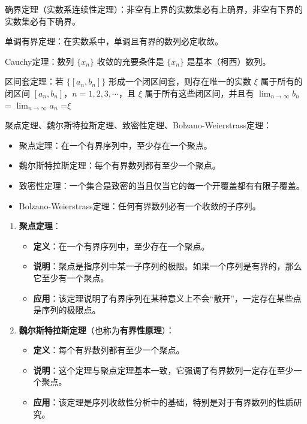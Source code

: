 \documentclass[lang=cn,newtx,10pt,scheme=chinese]{elegantbook}
\begin{document}
\begin{change}
  \item 确界定理（实数系连续性定理）：非空有上界的实数集必有上确界，非空有下界的实数集必有下确界。
  \item 单调有界定理：在实数系中，单调且有界的数列必定收敛。
  \item Cauchy定理：数列 \(\{x_n\}\) 收敛的充要条件是 \(\{x_n\}\) 是基本（柯西）数列。
  \item 区间套定理：若 \(\{[a_n, b_n]\}\) 形成一个闭区间套，则存在唯一的实数 \(\xi\) 属于所有的闭区间 \([a_n, b_n]\)，\(n = 1, 2, 3, \cdots\)，且 \( \xi \) 属于所有这些闭区间，并且有 \( \lim_{n \to \infty} b_n \) = \( \lim_{n \to \infty} a_n  \) =\( \xi \) 
  \item 聚点定理、魏尔斯特拉斯定理、致密性定理、Bolzano-Weierstrass定理：
    \begin{itemize}
      \item 聚点定理：在一个有界序列中，至少存在一个聚点。
      \item 魏尔斯特拉斯定理：每个有界数列都有至少一个聚点。
      \item 致密性定理：一个集合是致密的当且仅当它的每一个开覆盖都有有限子覆盖。
      \item Bolzano-Weierstrass定理：任何有界数列必有一个收敛的子序列。
    \end{itemize}
\begin{enumerate}
  \item \textbf{聚点定理}：
    \begin{itemize}
      \item \textbf{定义}：在一个有界序列中，至少存在一个聚点。
      \item \textbf{说明}：聚点是指序列中某一子序列的极限。如果一个序列是有界的，那么它至少有一个聚点。
      \item \textbf{应用}：该定理说明了有界序列在某种意义上不会“散开”，一定存在某些点是序列的极限点。
    \end{itemize}
    
  \item \textbf{魏尔斯特拉斯定理}（也称为\textbf{有界性原理}）：
    \begin{itemize}
      \item \textbf{定义}：每个有界数列都有至少一个聚点。
      \item \textbf{说明}：这个定理与聚点定理基本一致，它强调了有界数列一定存在至少一个聚点。
      \item \textbf{应用}：该定理是序列收敛性分析中的基础，特别是对于有界数列的性质研究。
    \end{itemize}
    

\end{enumerate}
\end{change}
\end{document}
